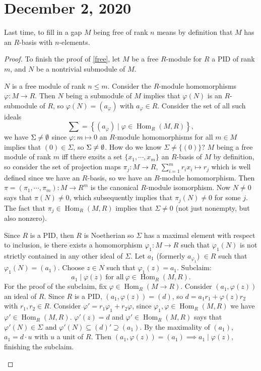 \section{December 2, 2020}
Last time, to fill in a gap $M$ being free of rank $n$ means by definition that $M$ has an $R$-basis with $n$-elements. 
\begin{proof}
    To finish the proof of \cref{free}, let $M$ be a free $R$-module for $R$ a PID of rank $m$, and $ N$ be a nontrivial submodule of $M$.

\begin{claim}
    $N$ is a free module of rank $n\leq m$. Consider the $R$-module homomorphisms $\varphi \colon M \to R$. Then $N$ being a submodule of $M$ implies that $\varphi (N)$ is an $R$-submodule of $R$, so $\varphi (N)=(a_{\varphi })$ with $a_{\varphi }\in R$. Consider the set of all such ideals \[
        \sum=\left\{\left( a_{\varphi } \right)  \mid \varphi \in \operatorname{Hom}_R(M,R)\right\} ,
    \] we have $\Sigma\neq \emptyset$ since $\varphi \colon m \mapsto 0 $ an $R$-module homomorphisms for all $m\in M$ implies that $(0)\in \Sigma$, so $\Sigma\neq \emptyset$. How do we know $\Sigma \neq \{\left( 0 \right) \} $? $M$ being a free module of rank $m$ iff there exsits a set $\{x_1,\cdots ,x_m\} $ an $R$-basis of $M$ by definition, so consider the set of projection maps $\pi_j \colon M \to R,\, \sum_{i=1}^{m} r_i x_i \mapsto r_j  $ which is well defined since we have an $R$-basis, so we have an $R$-module homomorphism. Then $\pi=\left( \pi_1,\cdots ,\pi_m \right) \colon M \to R^m$ is the canonical $R$-module isomorphism. Now $N\neq 0$ says that $\pi(N)\neq 0$, which subsequently implies that $\pi_j (N)\neq 0$ for some $j$. The fact that $\pi_j \in \operatorname{Hom}_R(M,R)$ implies that $\Sigma \neq 0$ (not just nonempty, but also nonzero).

    Since $R$ is a PID, then $R$ is Noetherian so $\Sigma$ has a maximal element with respect to inclusion, ie there exists a homomorphism $\varphi_1 \colon M \to R$ such that $\varphi_1(N) $ is not strictly contained in any other ideal of $\Sigma$. Let $a_1$ (formerly $a_{\varphi_1 }$) $\in R$ such that $\varphi_1(N)=(a_1) $. Choose $z\in N$ such that $\varphi_1(z)=a_1 $. Subclaim:
       \[
           a_1 \mid \varphi (z) \ \text{for all} \ \varphi \in \operatorname{Hom}_R(M,R).
       \]  For the proof of the subclaim, fix $\varphi \in \operatorname{Hom}_R(M\to R)$. Consider $\left( a_1,\varphi (z) \right) $ an ideal of $R$. Since $R$ is a PID, $\left( a_1,\varphi (z) \right) =(d)$, so $d=a_1r_1+\varphi (z)r_2$ with $r_1,r_2\in R$. Consider $\varphi '=r_1\varphi_1+r_2\varphi  $, since $\varphi_1,\varphi \in \operatorname{Hom}_R(M,R) $ we have $\varphi '\in \operatorname{Hom}_R(M,R)$. $\varphi '(z)=d$ and $\varphi '\in \operatorname{Hom}_R(M,R)$ says that $\varphi '(N)\in \Sigma$ and $\varphi '(N) \subseteq (d)'\supseteq (a_1)$. By the maximality of $(a_1)$, $a_1=d\cdot u$ with $u$ a unit of $R$. Then $(a_1,\varphi (z))=(a_1)\implies a_1 \mid \varphi (z)$, finishing the subclaim.


\end{claim}
\end{proof}
